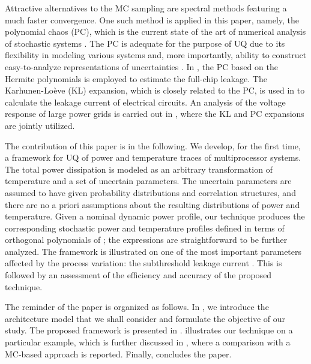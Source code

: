 Attractive alternatives to the MC sampling are spectral methods \cite{xiu2010, maitre2010, ghanem1991} featuring a much faster convergence. One such method is applied in this paper, namely, the polynomial chaos (PC), which is the current state of the art of numerical analysis of stochastic systems \cite{xiu2010}. The PC is adequate for the purpose of UQ due to its flexibility in modeling various systems and, more importantly, ability to construct easy-to-analyze representations of uncertainties \cite{eldred2009}. In \cite{shen2009}, the PC based on the Hermite polynomials is employed to estimate the full-chip leakage. The Karhunen-Lo\`{e}ve (KL) expansion, which is closely related to the PC, is used in \cite{bhardwaj2006} to calculate the leakage current of electrical circuits. An analysis of the voltage response of large power grids is carried out in \cite{ghanta2006}, where the KL and PC expansions are jointly utilized.

The contribution of this paper is in the following. We develop, for the first time, a framework for UQ of power and temperature traces of multiprocessor systems. The total power dissipation is modeled as an arbitrary transformation of temperature and a set of uncertain parameters. The uncertain parameters are assumed to have given probability distributions and correlation structures, and there are no a priori assumptions about the resulting distributions of power and temperature. Given a nominal dynamic power profile, our technique produces the corresponding stochastic power and temperature profiles defined in terms of orthogonal polynomials of \rvs; the expressions are straightforward to be further analyzed. The framework is illustrated on one of the most important parameters affected by the process variation: the subthreshold leakage current \cite{srivastava2010}. This is followed by an assessment of the efficiency and accuracy of the proposed technique.

The reminder of the paper is organized as follows. In , we introduce the architecture model that we shall consider and formulate the objective of our study. The proposed framework is presented in .  illustrates our technique on a particular example, which is further discussed in , where a comparison with a MC-based approach is reported. Finally,  concludes the paper.
